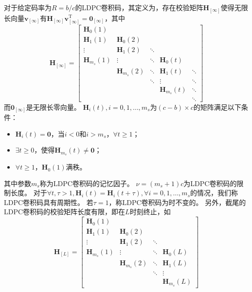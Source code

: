 对于给定码率为$R=b/c$的LDPC卷积码，其定义为，存在校验矩阵$\mathbf{H}_{[\infty]}$使得无限长向量$\mathbf{v}_{[\infty]}$有$\mathbf{H}_{[\infty]}\mathbf{v}_{[\infty]}^\text{T} =\mathbf{0}_{[\infty]}$，其中
\begin{equation}
    \mathbf{H}_{[\infty]} = \left[
          \begin{array}{ccccc}
            \mathbf{H}_0(1) & & & & \\
            \mathbf{H}_1(1) & \mathbf{H}_0(2) & & & \\
            \vdots & \mathbf{H}_1(2) & \ddots & & \\
            \mathbf{H}_{m_s}(1) & \vdots & \ddots & \mathbf{H}_0(t) & \\
             & \mathbf{H}_{m_s}(2) & \ddots & \mathbf{H}_1(t) & \ddots\\
             & & \ddots & \vdots & \ddots \\
             & & & \mathbf{H}_{m_s}(t) & \ddots \\
             & & & & \ddots
          \end{array} \right]
\end{equation}
而$\mathbf{0}_{[\infty]}$是无限长零向量。
$\mathbf{H}_i(t),i=0,1,\dots,m_s$为$(c-b)\times c$的矩阵满足以下条件：
\begin{itemize}
\item $\mathbf{H}_i(t)=\mathbf{0}$，当$i<0$和$i>m_s$，$\forall t \geq 1$；
\item $\exists t\geq 0$，使得$\mathbf{H}_{m_s}(t) \neq \mathbf{0}$；
\item $\forall t \geq 1$，$\mathbf{H}_0(1)$满秩。
\end{itemize}

其中参数$m_s$称为LDPC卷积码的记忆因子。
$\nu = (m_s+1)c$为LDPC卷积码的限制长度。
对于$\forall t,\tau>1,\mathbf{H}_i(t) = \mathbf{H}_i(t+\tau),\forall i = 0,1,\dots,m_s$的情况，我们称LDPC卷积码具有周期性。
若$\tau=1$，称LDPC卷积码为时不变的。
另外，截尾的LDPC卷积码的校验矩阵长度有限，即在$L$时刻终止，如
\begin{equation}
    \mathbf{H}_{[L]} = \left[
          \begin{array}{cccc}
            \mathbf{H}_0(1) & & & \\
            \mathbf{H}_1(1) & \mathbf{H}_0(2) & & \\
            \vdots & \mathbf{H}_1(2) & \ddots & \\
            \mathbf{H}_{m_s}(1) & \vdots & \ddots & \mathbf{H}_0(L) \\
             & \mathbf{H}_{m_s}(2) & \ddots & \mathbf{H}_1(L) \\
             & & \ddots & \vdots \\
             & & & \mathbf{H}_{m_s}(L)
          \end{array} \right]
\end{equation}

